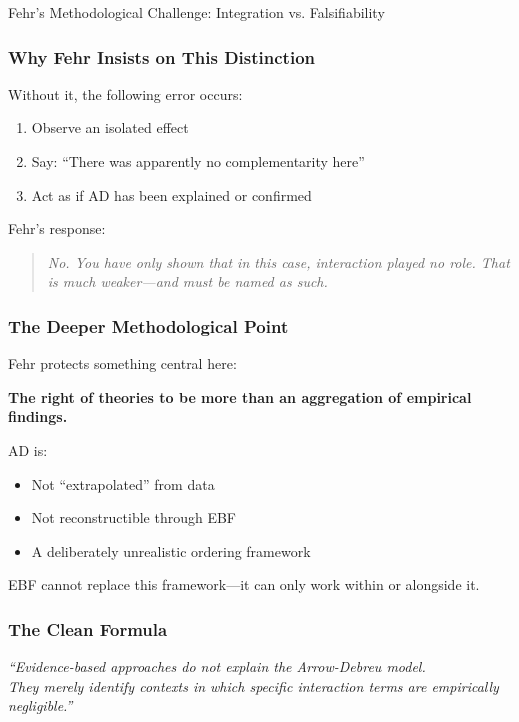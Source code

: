 \begin{chapter}{Fehr's Methodological Challenge: Integration vs. Falsifiability}
\subsubsection{Why Fehr Insists on This Distinction}

Without it, the following error occurs:
\begin{enumerate}
    \item Observe an isolated effect
    \item Say: ``There was apparently no complementarity here''
    \item Act as if AD has been explained or confirmed
\end{enumerate}

Fehr's response:

\begin{quote}
\textit{No. You have only shown that in this case, interaction played no role. That is much weaker---and must be named as such.}
\end{quote}

\subsubsection{The Deeper Methodological Point}

Fehr protects something central here:

\begin{tcolorbox}[colback=gray!10!white,colframe=gray!75!black]
\textbf{The right of theories to be more than an aggregation of empirical findings.}
\end{tcolorbox}

AD is:
\begin{itemize}[noitemsep]
    \item Not ``extrapolated'' from data
    \item Not reconstructible through EBF
    \item A deliberately unrealistic ordering framework
\end{itemize}

EBF cannot replace this framework---it can only work within or alongside it.

\subsubsection{The Clean Formula}

\begin{tcolorbox}[colback=green!5!white,colframe=green!75!black]
\begin{center}
\textit{``Evidence-based approaches do not explain the Arrow-Debreu model.\\
They merely identify contexts in which specific interaction terms are empirically negligible.''}
\end{center}
\end{tcolorbox}


\end{chapter}
